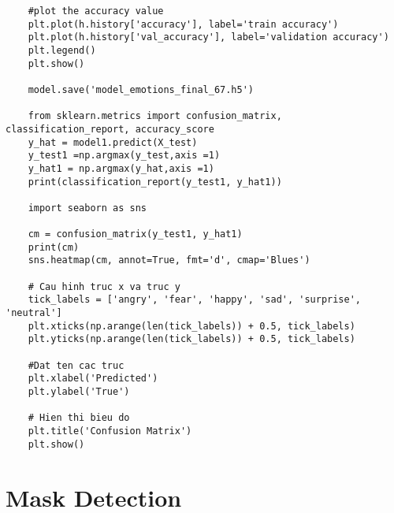\begin{lstlisting}
	#plot the accuracy value
	plt.plot(h.history['accuracy'], label='train accuracy')
	plt.plot(h.history['val_accuracy'], label='validation accuracy')
	plt.legend()
	plt.show()
	
	model.save('model_emotions_final_67.h5')
	
	from sklearn.metrics import confusion_matrix, classification_report, accuracy_score
	y_hat = model1.predict(X_test)
	y_test1 =np.argmax(y_test,axis =1)
	y_hat1 = np.argmax(y_hat,axis =1)
	print(classification_report(y_test1, y_hat1))
	
	import seaborn as sns
	
	cm = confusion_matrix(y_test1, y_hat1)
	print(cm)
	sns.heatmap(cm, annot=True, fmt='d', cmap='Blues')
	
	# Cau hinh truc x va truc y 
	tick_labels = ['angry', 'fear', 'happy', 'sad', 'surprise', 'neutral']
	plt.xticks(np.arange(len(tick_labels)) + 0.5, tick_labels)
	plt.yticks(np.arange(len(tick_labels)) + 0.5, tick_labels)
	
	#Dat ten cac truc 
	plt.xlabel('Predicted')
	plt.ylabel('True')
	
	# Hien thi bieu do
	plt.title('Confusion Matrix')
	plt.show()
\end{lstlisting}

\section{Mask Detection}


